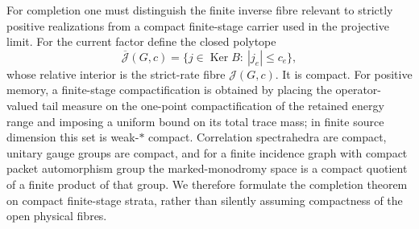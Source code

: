 \documentclass[11pt]{article}
\theoremstyle{definition}
\theoremstyle{remark}
\theoremstyle{definition}
\theoremstyle{remark}
\newcommand{\Ker}{\operatorname{Ker}}
\begin{document}
For completion one must distinguish the finite inverse fibre relevant to strictly
positive realizations from a compact finite-stage carrier used in the projective
limit.  For the current factor define the closed polytope
\begin{equation}
 \overline{\mathcal J}(G,c)
 =\{j\in\Ker B:\ |j_e|\le c_e\},
 \label{eq:supp-closed-current-polytope}
\end{equation}
whose relative interior is the strict-rate fibre $\mathcal J(G,c)$.  It is compact.
For positive memory, a finite-stage compactification is obtained by placing the
operator-valued tail measure on the one-point compactification of the retained
energy range and imposing a uniform bound on its total trace mass; in finite source
dimension this set is weak-$*$ compact.  Correlation spectrahedra are compact,
unitary gauge groups are compact, and for a finite incidence graph with compact
packet automorphism group the marked-monodromy space is a compact quotient of a
finite product of that group.  We therefore formulate the completion theorem on
compact finite-stage strata, rather than silently assuming compactness of the open
physical fibres.
\end{document}
